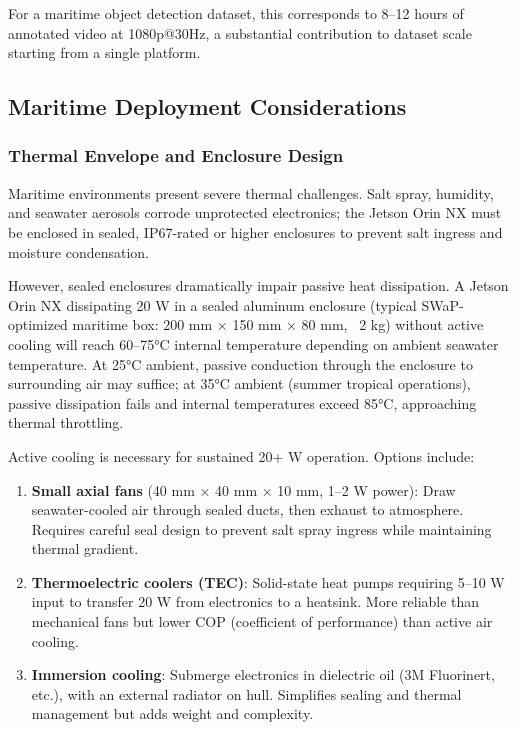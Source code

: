 For a maritime object detection dataset, this corresponds to 8--12 hours of annotated video at 1080p@30Hz, a substantial contribution to dataset scale starting from a single platform.



\subsection{Maritime Deployment Considerations}

\subsubsection{Thermal Envelope and Enclosure Design}

Maritime environments present severe thermal challenges. Salt spray, humidity, and seawater aerosols corrode unprotected electronics; the Jetson Orin NX must be enclosed in sealed, IP67-rated or higher enclosures to prevent salt ingress and moisture condensation. \cite{Noel2024LannerMaritime}

However, sealed enclosures dramatically impair passive heat dissipation. A Jetson Orin NX dissipating 20 W in a sealed aluminum enclosure (typical SWaP-optimized maritime box: 200 mm × 150 mm × 80 mm, ~2 kg) without active cooling will reach 60--75°C internal temperature depending on ambient seawater temperature. At 25°C ambient, passive conduction through the enclosure to surrounding air may suffice; at 35°C ambient (summer tropical operations), passive dissipation fails and internal temperatures exceed 85°C, approaching thermal throttling.

Active cooling is necessary for sustained 20+ W operation. Options include:
\begin{enumerate}
  \item \textbf{Small axial fans} (40 mm × 40 mm × 10 mm, 1--2 W power): Draw seawater-cooled air through sealed ducts, then exhaust to atmosphere. Requires careful seal design to prevent salt spray ingress while maintaining thermal gradient.
  \item \textbf{Thermoelectric coolers (TEC)}: Solid-state heat pumps requiring 5--10 W input to transfer 20 W from electronics to a heatsink. More reliable than mechanical fans but lower COP (coefficient of performance) than active air cooling.
  \item \textbf{Immersion cooling}: Submerge electronics in dielectric oil (3M Fluorinert, etc.), with an external radiator on hull. Simplifies sealing and thermal management but adds weight and complexity.
\end{enumerate}


